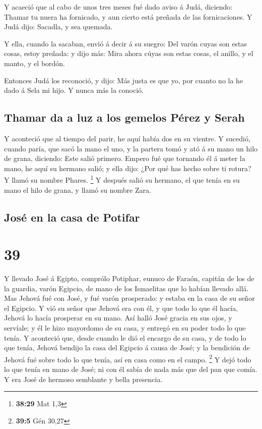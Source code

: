  Y acaeció que al cabo de unos tres meses fué dado aviso
á Judá, diciendo: Thamar tu nuera ha fornicado, y aun cierto está
preñada de las fornicaciones. Y Judá dijo: Sacadla, y sea quemada.

 Y ella, cuando la sacaban, envió á decir á su suegro:
Del varón cuyas son estas cosas, estoy preñada: y dijo más: Mira ahora
cúyas son estas cosas, el anillo, y el manto, y el bordón.

 Entonces Judá los reconoció, y dijo: Más justa es que
yo, por cuanto no la he dado á Sela mi hijo. Y nunca más la conoció.

\hypertarget{thamar-da-a-luz-a-los-gemelos-puxe9rez-y-serah}{%
\subsection{Thamar da a luz a los gemelos Pérez y
Serah}\label{thamar-da-a-luz-a-los-gemelos-puxe9rez-y-serah}}

 Y aconteció que al tiempo del parir, he aquí había dos
en su vientre.  Y sucedió, cuando paría, que sacó la mano
el uno, y la partera tomó y ató á su mano un hilo de grana, diciendo:
Este salió primero.  Empero fué que tornando él á meter
la mano, he aquí su hermano salió; y ella dijo: ¿Por qué has hecho sobre
ti rotura? Y llamó su nombre Phares. \footnote{\textbf{38:29} Mat 1,3}
 Y después salió su hermano, el que tenía en su mano el
hilo de grana, y llamó su nombre Zara.

\hypertarget{josuxe9-en-la-casa-de-potifar}{%
\subsection{José en la casa de
Potifar}\label{josuxe9-en-la-casa-de-potifar}}

\hypertarget{section-38}{%
\section{39}\label{section-38}}

 Y llevado José á Egipto, comprólo Potiphar, eunuco de
Faraón, capitán de los de la guardia, varón Egipcio, de mano de los
Ismaelitas que lo habían llevado allá.  Mas Jehová fué con
José, y fué varón prosperado: y estaba en la casa de su señor el
Egipcio.  Y vió su señor que Jehová era con él, y que todo
lo que él hacía, Jehová lo hacía prosperar en su mano. 
Así halló José gracia en sus ojos, y servíale; y él le hizo mayordomo de
su casa, y entregó en su poder todo lo que tenía.  Y
aconteció que, desde cuando le dió el encargo de su casa, y de todo lo
que tenía, Jehová bendijo la casa del Egipcio á causa de José; y la
bendición de Jehová fué sobre todo lo que tenía, así en casa como en el
campo. \footnote{\textbf{39:5} Gén 30,27}  Y dejó todo lo
que tenía en mano de José; ni con él sabía de nada más que del pan que
comía. Y era José de hermoso semblante y bella presencia.

